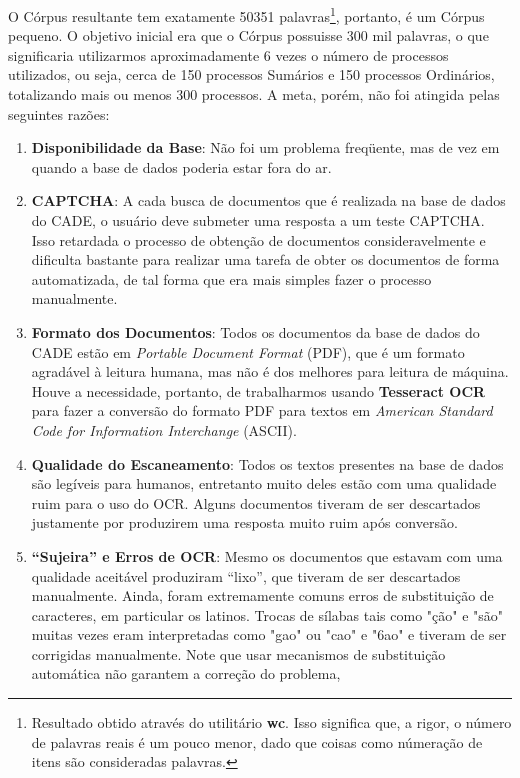 \documentclass[11pt]{report}
\newcommand{\quotes}[1]{``#1''}
\begin{document}
O Córpus resultante tem exatamente 50351 palavras\footnote[8]{Resultado obtido através do utilitário \textbf{wc}. Isso significa que, a rigor, o número de palavras
reais é um pouco menor, dado que coisas como númeração de itens são consideradas palavras.}, portanto, é um Córpus pequeno. O objetivo inicial era que o Córpus
possuisse 300 mil palavras, o que significaria utilizarmos aproximadamente 6 vezes o número de processos utilizados, ou seja, cerca de 150 processos Sumários e
150 processos Ordinários, totalizando mais ou menos 300 processos. A meta, porém, não foi atingida pelas seguintes razões:

\begin{enumerate}[label=\textbf{\arabic*.}]
  \item \textbf{Disponibilidade da Base}: Não foi um problema freqüente, mas de vez em quando a base de dados poderia estar fora do ar.
  \item \textbf{CAPTCHA}: A cada busca de documentos que é realizada na base de dados do CADE, o usuário deve submeter uma resposta a um teste CAPTCHA. Isso
  retardada o processo de obtenção de documentos consideravelmente e dificulta bastante para realizar uma tarefa de obter os documentos de forma automatizada, de tal
  forma que era mais simples fazer o processo manualmente.
  \item \textbf{Formato dos Documentos}: Todos os documentos da base de dados do CADE estão em \textit{Portable Document Format} (PDF), que é um formato agradável à
  leitura humana, mas não é dos melhores para leitura de máquina. Houve a necessidade, portanto,  de trabalharmos usando \textbf{Tesseract OCR} para fazer a conversão do
  formato PDF para textos em \textit{American Standard Code for Information Interchange} (ASCII).
  \item \textbf{Qualidade do Escaneamento}: Todos os textos presentes na base de dados são legíveis para humanos, entretanto muito deles estão com uma qualidade ruim para
  o uso do OCR. Alguns documentos tiveram de ser descartados justamente por produzirem uma resposta muito ruim após conversão.
  \item \textbf{\quotes{Sujeira} e Erros de OCR}: Mesmo os documentos que estavam com uma qualidade aceitável produziram \quotes{lixo}, que tiveram de ser descartados
  manualmente. Ainda, foram extremamente comuns erros de substituição de caracteres, em particular os latinos. Trocas de sílabas tais como "ção" e "são" muitas vezes eram
  interpretadas como "gao" ou "cao" e "6ao" e tiveram de ser corrigidas manualmente. Note que usar mecanismos de substituição automática não garantem a correção do problema,

\end{enumerate}
\end{document}
